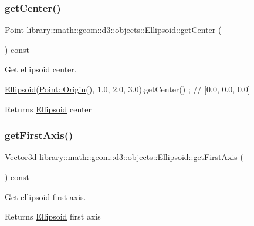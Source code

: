\subsubsection{\texorpdfstring{get\+Center()}{getCenter()}}
{\footnotesize\ttfamily \hyperlink{classlibrary_1_1math_1_1geom_1_1d3_1_1objects_1_1_point}{Point} library\+::math\+::geom\+::d3\+::objects\+::\+Ellipsoid\+::get\+Center (\begin{DoxyParamCaption}{ }\end{DoxyParamCaption}) const}



Get ellipsoid center. 


\begin{DoxyCode}
\hyperlink{classlibrary_1_1math_1_1geom_1_1d3_1_1objects_1_1_ellipsoid_aae81fe0edc7f0e8d4590ea89ae73cb14}{Ellipsoid}(\hyperlink{classlibrary_1_1math_1_1geom_1_1d3_1_1objects_1_1_point_ab2a38e285c562e50bf350272c083986f}{Point::Origin}(), 1.0, 2.0, 3.0).getCenter() ; \textcolor{comment}{// [0.0, 0.0, 0.0]}
\end{DoxyCode}


\begin{DoxyReturn}{Returns}
\hyperlink{classlibrary_1_1math_1_1geom_1_1d3_1_1objects_1_1_ellipsoid}{Ellipsoid} center 
\end{DoxyReturn}
\mbox{\label{classlibrary_1_1math_1_1geom_1_1d3_1_1objects_1_1_ellipsoid_a155ca01528d96ae76bfcbb155c832a20}} 
\subsubsection{\texorpdfstring{get\+First\+Axis()}{getFirstAxis()}}
{\footnotesize\ttfamily Vector3d library\+::math\+::geom\+::d3\+::objects\+::\+Ellipsoid\+::get\+First\+Axis (\begin{DoxyParamCaption}{ }\end{DoxyParamCaption}) const}



Get ellipsoid first axis. 

\begin{DoxyReturn}{Returns}
\hyperlink{classlibrary_1_1math_1_1geom_1_1d3_1_1objects_1_1_ellipsoid}{Ellipsoid} first axis 
\end{DoxyReturn}
\mbox{\label{classlibrary_1_1math_1_1geom_1_1d3_1_1objects_1_1_ellipsoid_a8219b05b4c6afcd71e915d10b6129baf}} 
